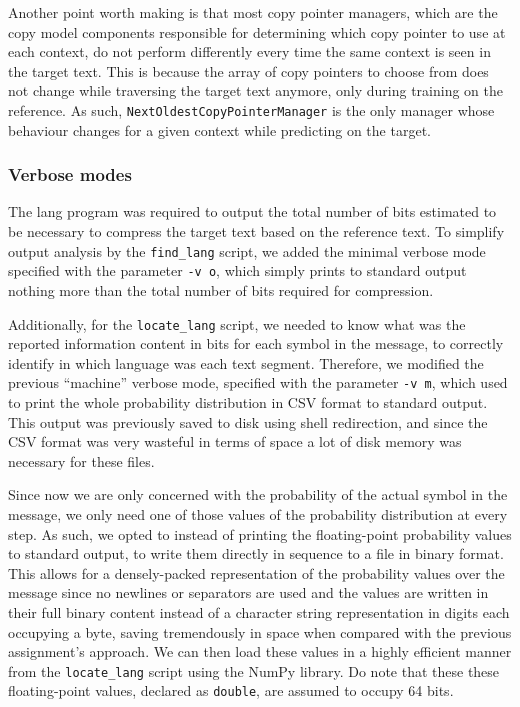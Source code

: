 \documentclass{article}
\begin{document}
Another point worth making is that most copy pointer managers, which are the copy model components responsible for determining which copy pointer to use at each context, do not perform differently every time the same context is seen in the target text.
This is because the array of copy pointers to choose from does not change while traversing the target text anymore, only during training on the reference.
As such, \verb|NextOldestCopyPointerManager| is the only manager whose behaviour changes for a given context while predicting on the target.


\subsubsection{Verbose modes}
\label{subsubsec:methodology_lang_model_verbose}

The lang program was required to output the total number of bits estimated to be necessary to compress the target text based on the reference text.
To simplify output analysis by the \verb|find_lang| script, we added the minimal verbose mode specified with the parameter \verb|-v o|, which simply prints to standard output nothing more than the total number of bits required for compression.

Additionally, for the \verb|locate_lang| script, we needed to know what was the reported information content in bits for each symbol in the message, to correctly identify in which language was each text segment.
Therefore, we modified the previous ``machine'' verbose mode, specified with the parameter \verb|-v m|, which used to print the whole probability distribution in CSV format to standard output.
This output was previously saved to disk using shell redirection, and since the CSV format was very wasteful in terms of space a lot of disk memory was necessary for these files.

Since now we are only concerned with the probability of the actual symbol in the message, we only need one of those values of the probability distribution at every step.
As such, we opted to instead of printing the floating-point probability values to standard output, to write them directly in sequence to a file in binary format.
This allows for a densely-packed representation of the probability values over the message since no newlines or separators are used and the values are written in their full binary content instead of a character string representation in digits each occupying a byte, saving tremendously in space when compared with the previous assignment's approach.
We can then load these values in a highly efficient manner from the \verb|locate_lang| script using the NumPy library.
Do note that these these floating-point values, declared as \verb|double|, are assumed to occupy 64 bits.
\end{document}
